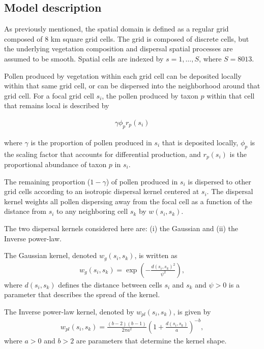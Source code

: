 \documentclass[12pt]{article}
\begin{document}
\subsection{Model description}

As previously mentioned, the spatial domain is defined as a regular
grid composed of 8 km square grid cells. The grid is composed of
discrete cells, but the underlying vegetation composition and
dispersal spatial processes are assumed to be smooth. Spatial cells
are indexed by $s=1,\ldots,S$, where $S=8013$.

Pollen produced by vegetation within each grid cell can be deposited
locally within that same grid cell, or can be dispersed into the
neighborhood around that grid cell. For a focal grid cell
$s_i$, the pollen produced by taxon $p$ within that cell that remains
local is described by

\begin{align}
\gamma \phi_p r_p(s_i)
\end{align} 

where $\gamma$ is the proportion of pollen produced in $s_i$ that is deposited locally,
$\phi_p$ is the scaling factor that accounts for differential
production, and $r_p(s_i)$ is the proportional abundance of taxon $p$
in $s_i$.

The remaining proportion ($1-\gamma$) of pollen produced in $s_i$ is
dispersed to other grid cells according to an isotropic dispersal
kernel centered at $s_i$. The dispersal kernel weights all pollen
dispersing away from the focal cell as a function of the distance from
$s_i$ to any neighboring cell $s_k$ by $w(s_i, s_k)$. 

The two dispersal kernels considered here are: (i) the Gaussian and
(ii) the Inverse power-law.

The Gaussian kernel, denoted $w_g(s_i,s_k)$, is written as
\begin{align}
w_g(s_i, s_k) = \exp\left( - \frac{d(s_i, s_k)^2}{\psi^2} \right),
\end{align}
where $d(s_i,s_k)$ defines the distance between cells $s_i$ and $s_k$
and $\psi>0$ is a parameter that describes the spread of the kernel. 

The Inverse power-law kernel, denoted by $w_{pl}(s_i,s_k)$, is given by
\begin{align}
w_{pl}(s_i, s_k) = \frac{(b-2)(b-1)}{2 \pi a^2} \left( 1 + \frac{d(s_i, s_k)}{a} \right)^{-b},
\end{align}
where $a>0$ and $b>2$ are parameters that determine the kernel shape. 
\end{document}
